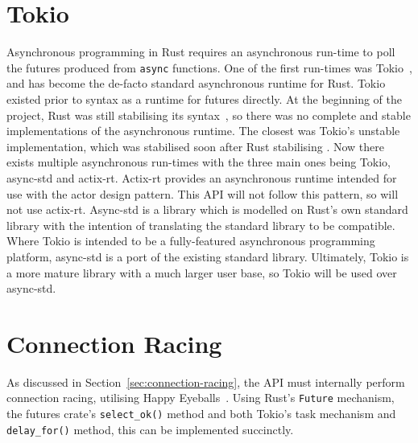 \section{Tokio}\label{sec:tokio}
Asynchronous programming in Rust requires an asynchronous run-time to poll the futures produced from \texttt{async}
functions.
One of the first run-times was Tokio~\citep{tokiocommunity_tokioasynchronousruntime_}, and has become the de-facto standard
asynchronous runtime for Rust.
Tokio existed prior to \asyncawait{} syntax as a runtime for futures directly.
At the beginning of the project, Rust was still stabilising its \asyncawait{} syntax~\citep{withoutboats_asyncawaitnotation_},
so there was no
complete and stable implementations of the asynchronous runtime.
The closest was Tokio's unstable implementation, which was stabilised soon after Rust stabilising
\asyncawait{}.
Now there exists multiple asynchronous run-times with the three main ones being Tokio, async-std and actix-rt.
Actix-rt provides an asynchronous runtime intended for use with the actor design pattern.
This API will not follow this pattern, so will not use actix-rt.
Async-std is a library which is modelled on Rust's own standard library with the intention of translating the standard
library to be \asyncawait{} compatible.
Where Tokio is intended to be a fully-featured asynchronous programming platform, async-std is a port of the existing
standard library.
Ultimately, Tokio is a more mature library with a much larger user base, so Tokio will be used over async-std.

\section{Connection Racing}\label{sec:connection-racing-impl}
As discussed in Section~\ref{sec:connection-racing}, the API must internally perform connection racing, utilising
Happy Eyeballs~\citep{pauly_happyeyeballsversion_}.
Using Rust's \texttt{Future} mechanism, the futures crate's \texttt{select\_ok()} method and both Tokio's task mechanism
and \texttt{delay\_for()} method, this can be implemented succinctly.

